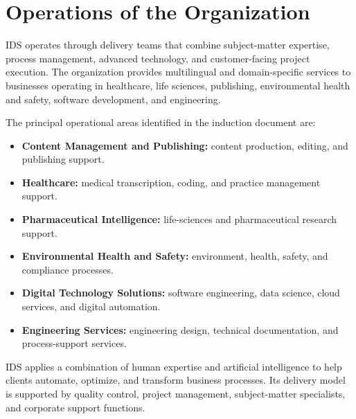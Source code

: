 \documentclass[12pt,a4paper]{report}
\begin{document}
\section{Operations of the Organization}
\label{sec:operations-of-organization}
IDS operates through delivery teams that combine subject-matter expertise, process management,
advanced technology, and customer-facing project execution. The organization provides
multilingual and domain-specific services to businesses operating in healthcare, life sciences,
publishing, environmental health and safety, software development, and engineering.

The principal operational areas identified in the induction document are:
\begin{itemize}
    \item \textbf{Content Management and Publishing:} content production, editing, and publishing
    support.
    \item \textbf{Healthcare:} medical transcription, coding, and practice management support.
    \item \textbf{Pharmaceutical Intelligence:} life-sciences and pharmaceutical research support.
    \item \textbf{Environmental Health and Safety:} environment, health, safety, and compliance
    processes.
    \item \textbf{Digital Technology Solutions:} software engineering, data science, cloud
    services, and digital automation.
    \item \textbf{Engineering Services:} engineering design, technical documentation, and
    process-support services.
\end{itemize}

IDS applies a combination of human expertise and artificial intelligence to help clients
automate, optimize, and transform business processes. Its delivery model is supported by
quality control, project management, subject-matter specialists, and corporate support functions.
\end{document}
